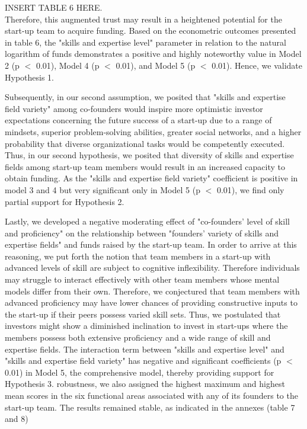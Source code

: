 \documentclass[12pt]{article}
\begin{document}
INSERT TABLE 6 HERE. \\

Therefore, this augmented trust may result in a heightened potential for the start-up team to acquire funding. Based on the econometric outcomes presented in table 6, the "skills and expertise level" parameter in relation to the natural logarithm of funds demonstrates a positive and highly noteworthy value in Model 2 (p $<$ 0.01), Model 4 (p $<$ 0.01), and Model 5 (p $<$ 0.01). Hence, we validate Hypothesis 1.

Subsequently, in our second assumption, we posited that "skills and expertise field variety" among co-founders would inspire more optimistic investor expectations concerning the future success of a start-up due to a range of mindsets, superior problem-solving abilities, greater social networks, and a higher probability that diverse organizational tasks would be competently executed. Thus, in our second hypothesis, we posited that diversity of skills and expertise fields among start-up team members would result in an increased capacity to obtain funding. As the "skills and expertise field variety" coefficient is positive in model 3 and 4 but very significant only in Model 5 (p $<$ 0.01), we find only partial support for Hypothesis 2.

Lastly, we developed a negative moderating effect of "co-founders’ level of skill and proficiency" on the relationship between "founders’ variety of skills and expertise fields" and funds raised by the start-up team. In order to arrive at this reasoning, we put forth the notion that team members in a start-up with advanced levels of skill are subject to cognitive inflexibility. Therefore individuals may struggle to interact effectively with other team members whose mental models differ from their own. Therefore, we conjectured that team members with advanced proficiency may have lower chances of providing constructive inputs to the start-up if their peers possess varied skill sets. Thus, we postulated that investors might show a diminished inclination to invest in start-ups where the members possess both extensive proficiency and a wide range of skill and expertise fields. The interaction term between "skills and expertise level" and "skills and expertise field variety" has negative and significant coefficients (p $<$ 0.01) in Model 5, the comprehensive model, thereby providing support for Hypothesis 3. robustness, we also assigned the highest maximum and highest mean scores in the six functional areas associated with any of its founders to the start-up team. The results remained stable, as indicated in the annexes (table 7 and 8)
\end{document}
